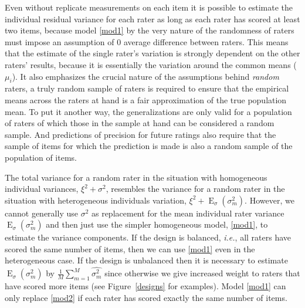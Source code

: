 \documentclass[aoas]{imsart}
\makeatletter
\newcommand{\E}{\operatorname{E}}
\newcommand{\ie}{\emph{i.e.}\@\xspace}
\makeatother
\begin{document}
Even without replicate measurements on each item it is possible to
estimate the individual residual variance for each rater as long as
each rater has scored at least two items, because model \eqref{mod1}
by the very nature of the randomness of raters must impose an
assumption of 0 average difference between raters. This means that the
estimate of the single rater's variation is strongly dependent on the
other raters' results, because it is essentially the variation around
the common means ($\mu_i$).
%
It also emphasizes the crucial nature of the assumptions behind
\emph{random} raters, a truly random sample of raters is required to
ensure that the empirical means across the raters at hand is a fair
approximation of the true population mean. To put it another way, the
generalizations are only valid for a population of raters of which
those in the sample at hand can be considered a random sample. And
predictions of precision for future ratings also require that the
sample of items for which the prediction is made is also a random
sample of the population of items.




The total variance for a random rater in the situation with
homogeneous individual variances, $\xi^2+\sigma^2$, resembles the
variance for a random rater in the situation with heterogeneous
individuals variation, $\xi^2 + \E_\sigma(\sigma_m^2)$. However, we
cannot generally use $\sigma^2$ as replacement for the mean individual
rater variance $\E_\sigma(\sigma_m^2)$ and then just use the simpler
homogeneous model, \eqref{mod1}, to estimate the variance
components. If the design is balanced, \ie, all raters have scored the
same number of items, then we can use \eqref{mod1} even in the
heterogeneous case. If the design is unbalanced then it is necessary
to estimate $\E_\sigma(\sigma_m^2)$ by $\frac 1M \sum_{m=1}^M
\widehat{\sigma_m^2}$ since otherwise we give increased weight to
  raters that have scored more items (see Figure~\ref{designs} for
  examples). Model \eqref{mod1} can only replace \eqref{mod2} if each rater
  has scored exactly the same number of items.
 
\end{document}
